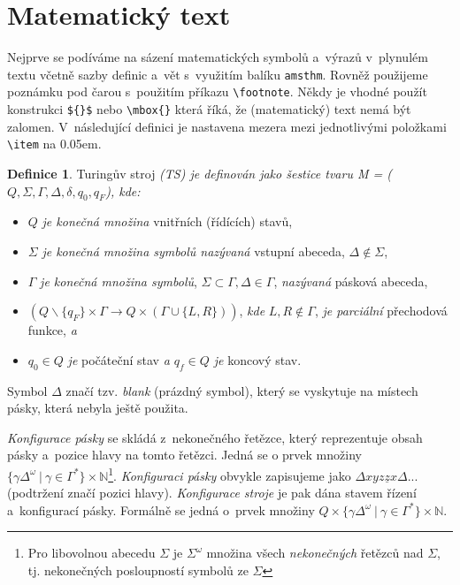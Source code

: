 \documentclass[twocolumn, 11pt, a4paper]{article}
\theoremstyle{definition}
\newtheorem{definice}{Definice}
\theoremstyle{plain}
\begin{document}
\section{Matematický text}
Nejprve se podíváme na sázení matematických symbolů a~výrazů v~plynulém textu včetně sazby definic a~vět s~využitím balíku \texttt{amsthm}. Rovněž použijeme poznámku pod čarou s~použitím příkazu \verb|\footnote|. Někdy je vhodné použít konstrukci \verb|${}$| nebo \verb|\mbox{}| která říká, že (matematický) text nemá být zalomen. V~následující definici je nastavena mezera mezi jednotlivými položkami \verb|\item| na 0.05em.
\begin{definice}
\label{ts-definice}
Turingův stroj \emph{(TS) je definován jako šestice tvaru M = ($Q, \Sigma, \Gamma, \Delta, \delta, q_0, q_F$), kde:}
\end{definice}
\begin{itemize} \itemsep0.05em
    \item $Q$ \emph{je konečná množina} vnitřních (řídících) stavů,
    \item $\Sigma$ \emph{je konečná množina symbolů nazývaná} vstupní abeceda, $\Delta \notin \Sigma$,
    \item $\Gamma$ \emph{je konečná množina symbolů}, $\Sigma \subset \Gamma, \Delta \in \Gamma$, \emph{nazývaná} pásková abeceda,
    \item $(Q \backslash \{ q_F \} \times \Gamma \rightarrow Q \times (\Gamma \cup \{L, R\}))$, \emph{kde} $L, R \notin \Gamma$, \emph{je parciální} přechodová funkce, \emph{a}
    \item $q_0 \in Q$ \emph{je} počáteční stav \emph{a $q_f \in Q$ je} koncový stav.
\end{itemize}
\par
 Symbol $\Delta$ značí tzv. \emph{blank} (prázdný symbol), který se vyskytuje na místech pásky, která nebyla ještě použita.
\par
\emph{Konfigurace pásky} se skládá z~nekonečného řetězce, který reprezentuje obsah pásky a~pozice hlavy na tomto řetězci. Jedná se o prvek množiny $\{\gamma\Delta^{\omega}\:|\: \gamma \in \Gamma^*\} \times \mathbb{N}$\footnote{Pro libovolnou abecedu $\Sigma$ je $\Sigma^\omega$ množina všech \emph{nekonečných} řetězců nad $\Sigma$, tj. nekonečných posloupností symbolů ze $\Sigma$}. \emph{Konfiguraci pásky} obvykle zapisujeme jako $\Delta xyz\underline{z}x \Delta$... (podtržení značí pozici hlavy). \emph{Konfigurace stroje} je pak dána stavem řízení a~konfigurací pásky. Formálně se jedná o~prvek množiny $Q \times \{ \gamma \Delta^{\omega}\:|\: \gamma \in \Gamma^*\} \times \mathbb{N}$.
\par
\end{document}
